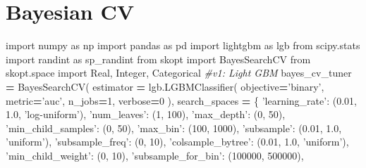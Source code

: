 \documentclass[]{book}
\newenvironment{Shaded}{\begin{snugshade}}{\end{snugshade}}
\newcommand{\CommentTok}[1]{\textcolor[rgb]{0.56,0.35,0.01}{\textit{#1}}}
\newcommand{\DecValTok}[1]{\textcolor[rgb]{0.00,0.00,0.81}{#1}}
\newcommand{\FloatTok}[1]{\textcolor[rgb]{0.00,0.00,0.81}{#1}}
\newcommand{\ImportTok}[1]{#1}
\newcommand{\NormalTok}[1]{#1}
\newcommand{\OperatorTok}[1]{\textcolor[rgb]{0.81,0.36,0.00}{\textbf{#1}}}
\newcommand{\StringTok}[1]{\textcolor[rgb]{0.31,0.60,0.02}{#1}}
\begin{document}
\hypertarget{bayesian-cv}{%
\section{Bayesian CV}\label{bayesian-cv}}

\begin{Shaded}
\begin{Highlighting}[]
\ImportTok{import}\NormalTok{ numpy }\ImportTok{as}\NormalTok{ np}
\ImportTok{import}\NormalTok{ pandas }\ImportTok{as}\NormalTok{ pd}
\ImportTok{import}\NormalTok{ lightgbm }\ImportTok{as}\NormalTok{ lgb}
\ImportTok{from}\NormalTok{ scipy.stats }\ImportTok{import}\NormalTok{ randint }\ImportTok{as}\NormalTok{ sp_randint}
\ImportTok{from}\NormalTok{ skopt }\ImportTok{import}\NormalTok{ BayesSearchCV}
\ImportTok{from}\NormalTok{ skopt.space }\ImportTok{import}\NormalTok{ Real, Integer, Categorical}
\CommentTok{#v1: Light GBM}
\NormalTok{bayes_cv_tuner }\OperatorTok{=}\NormalTok{ BayesSearchCV(}
\NormalTok{    estimator }\OperatorTok{=}\NormalTok{ lgb.LGBMClassifier(}
\NormalTok{        objective}\OperatorTok{=}\StringTok{'binary'}\NormalTok{,}
\NormalTok{        metric}\OperatorTok{=}\StringTok{'auc'}\NormalTok{,}
\NormalTok{        n_jobs}\OperatorTok{=}\DecValTok{1}\NormalTok{,}
\NormalTok{        verbose}\OperatorTok{=}\DecValTok{0}
\NormalTok{    ),}
\NormalTok{    search_spaces }\OperatorTok{=}\NormalTok{ \{}
        \StringTok{'learning_rate'}\NormalTok{: (}\FloatTok{0.01}\NormalTok{, }\FloatTok{1.0}\NormalTok{, }\StringTok{'log-uniform'}\NormalTok{),}
        \StringTok{'num_leaves'}\NormalTok{: (}\DecValTok{1}\NormalTok{, }\DecValTok{100}\NormalTok{),      }
        \StringTok{'max_depth'}\NormalTok{: (}\DecValTok{0}\NormalTok{, }\DecValTok{50}\NormalTok{),}
        \StringTok{'min_child_samples'}\NormalTok{: (}\DecValTok{0}\NormalTok{, }\DecValTok{50}\NormalTok{),}
        \StringTok{'max_bin'}\NormalTok{: (}\DecValTok{100}\NormalTok{, }\DecValTok{1000}\NormalTok{),}
        \StringTok{'subsample'}\NormalTok{: (}\FloatTok{0.01}\NormalTok{, }\FloatTok{1.0}\NormalTok{, }\StringTok{'uniform'}\NormalTok{),}
        \StringTok{'subsample_freq'}\NormalTok{: (}\DecValTok{0}\NormalTok{, }\DecValTok{10}\NormalTok{),}
        \StringTok{'colsample_bytree'}\NormalTok{: (}\FloatTok{0.01}\NormalTok{, }\FloatTok{1.0}\NormalTok{, }\StringTok{'uniform'}\NormalTok{),}
        \StringTok{'min_child_weight'}\NormalTok{: (}\DecValTok{0}\NormalTok{, }\DecValTok{10}\NormalTok{),}
        \StringTok{'subsample_for_bin'}\NormalTok{: (}\DecValTok{100000}\NormalTok{, }\DecValTok{500000}\NormalTok{),}

\end{Highlighting}
\end{Shaded}
\end{document}
